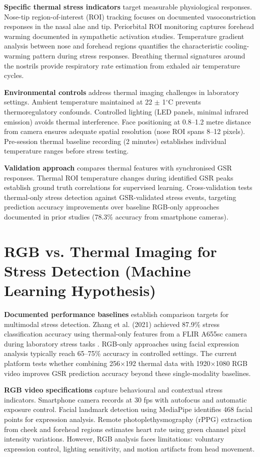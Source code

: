 \textbf{Specific thermal stress indicators} target measurable physiological responses. Nose-tip region-of-interest (ROI) tracking focuses on documented vasoconstriction responses in the nasal alae and tip. Periorbital ROI monitoring captures forehead warming documented in sympathetic activation studies. Temperature gradient analysis between nose and forehead regions quantifies the characteristic cooling-warming pattern during stress responses. Breathing thermal signatures around the nostrils provide respiratory rate estimation from exhaled air temperature cycles.

\textbf{Environmental controls} address thermal imaging challenges in laboratory settings. Ambient temperature maintained at 22 $\pm$ 1$^\circ$C prevents thermoregulatory confounds. Controlled lighting (LED panels, minimal infrared emission) avoids thermal interference. Face positioning at 0.8--1.2 metre distance from camera ensures adequate spatial resolution (nose ROI spans 8--12 pixels). Pre-session thermal baseline recording (2 minutes) establishes individual temperature ranges before stress testing.

\textbf{Validation approach} compares thermal features with synchronised GSR responses. Thermal ROI temperature changes during identified GSR peaks establish ground truth correlations for supervised learning. Cross-validation tests thermal-only stress detection against GSR-validated stress events, targeting prediction accuracy improvements over baseline RGB-only approaches documented in prior studies (78.3\% accuracy from smartphone cameras).


\section{RGB vs. Thermal Imaging for Stress Detection (Machine Learning Hypothesis)}
\textbf{Documented performance baselines} establish comparison targets for multimodal stress detection. Zhang et al. (2021) achieved 87.9\% stress classification accuracy using thermal-only features from a FLIR A655sc camera during laboratory stress tasks \cite{ref5}. RGB-only approaches using facial expression analysis typically reach 65--75\% accuracy in controlled settings. The current platform tests whether combining 256$\times$192 thermal data with 1920$\times$1080 RGB video improves GSR prediction accuracy beyond these single-modality baselines.

\textbf{RGB video specifications} capture behavioural and contextual stress indicators. Smartphone camera records at 30 fps with autofocus and automatic exposure control. Facial landmark detection using MediaPipe identifies 468 facial points for expression analysis. Remote photoplethysmography (rPPG) extraction from cheek and forehead regions estimates heart rate using green channel pixel intensity variations. However, RGB analysis faces limitations: voluntary expression control, lighting sensitivity, and motion artifacts from head movement.

